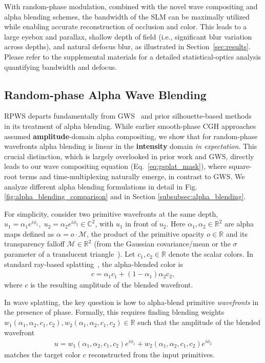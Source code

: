 With random-phase modulation, combined with the novel wave compositing and alpha blending schemes, the bandwidth of the SLM can be maximally utilized while enabling accurate reconstruction of occlusion and color. This leads to a large eyebox and parallax, shallow depth of field (i.e., significant blur variation across depths), and natural defocus blur, as illustrated in Section~\ref{sec:results}. Please refer to the supplemental materials for a detailed statistical-optics analysis quantifying bandwidth and defocus.

\subsection{Random-phase Alpha Wave Blending}
\label{sec:awb_random}

RPWS departs fundamentally from GWS~\cite{choi2025gaussian} and prior silhouette-based methods~\cite{matsushima2014silhouette} in its treatment of alpha blending. While earlier smooth-phase CGH approaches assumed \textbf{amplitude}-domain alpha compositing, we show that for random-phase wavefronts alpha blending is linear in the \textbf{intensity} domain \textit{in expectation}. This crucial distinction, which is largely overlooked in prior work and GWS, directly leads to our wave compositing equation (Eq.~\ref{eq:gsplat_mask}), where square-root terms and time-multiplexing naturally emerge, in contrast to GWS. We analyze different alpha blending formulations in detail in Fig. \ref{fig:alpha_blending_comparison} and in Section \ref{subsubsec:alpha_blending}. 

For simplicity, consider two primitive wavefronts at the same depth,
$u_1 = \alpha_1 e^{i\phi_1},\;u_2 = \alpha_2 e^{i\phi_2} \in \mathbb{C}^2$,
with $u_1$ in front of $u_2$. Here $\alpha_1, \alpha_2 \in \mathbb{R}^2$ are alpha maps defined as $\alpha = o \cdot \mathcal{M}$, the product of the primitive opacity $o \in \mathbb{R}$ and its transparency falloff $\mathcal{M} \in \mathbb{R}^2$ (from the Gaussian covariance/mean or the $\sigma$ parameter of a translucent triangle~\cite{Held2025Triangle}). Let $c_1, c_2 \in \mathbb{R}$ denote the scalar colors. In standard ray-based splatting~\cite{kerbl3Dgaussians, huang20242d, Held2025Triangle}, the alpha-blended color is
\begin{align}
c = \alpha_1 c_1 + (1 - \alpha_1)\alpha_2 c_2,
\label{eq:gs_ab}
\end{align}
where $c$ is the resulting amplitude of the blended wavefront.

In wave splatting, the key question is how to alpha-blend primitive \textit{wavefronts} in the presence of phase. Formally, this requires finding blending weights $w_1(\alpha_1, \alpha_2, c_1, c_2), w_2(\alpha_1, \alpha_2, c_1, c_2) \in \mathbb{R}$ such that the amplitude of the blended wavefront  
\begin{align}
    u = w_1(\alpha_1, \alpha_2, c_1, c_2) e^{i\phi_1} + w_2(\alpha_1, \alpha_2, c_1, c_2) e^{i\phi_2}
    \label{eq:blended_wavefront}
\end{align}
matches the target color $c$ reconstructed from the input primitives.

